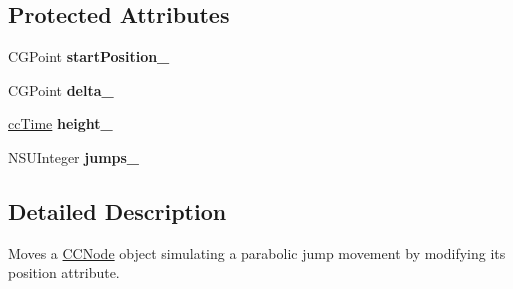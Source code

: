 \subsection*{Protected Attributes}
\begin{DoxyCompactItemize}
\item 
\hypertarget{interface_c_c_jump_by_af86c9ec10f8a7c7a73caff8ccf083383}{C\-G\-Point {\bfseries start\-Position\-\_\-}}\label{interface_c_c_jump_by_af86c9ec10f8a7c7a73caff8ccf083383}

\item 
\hypertarget{interface_c_c_jump_by_a4155293b23d8dd175de23860f7f63013}{C\-G\-Point {\bfseries delta\-\_\-}}\label{interface_c_c_jump_by_a4155293b23d8dd175de23860f7f63013}

\item 
\hypertarget{interface_c_c_jump_by_a854f06bdf7738a76cb6f2a527c0ab10f}{\hyperlink{cc_types_8h_ae6c674aac4bfb46a4e6cb1e89bb66b4f}{cc\-Time} {\bfseries height\-\_\-}}\label{interface_c_c_jump_by_a854f06bdf7738a76cb6f2a527c0ab10f}

\item 
\hypertarget{interface_c_c_jump_by_a46884c98841fca9e28e7f08626ecced5}{N\-S\-U\-Integer {\bfseries jumps\-\_\-}}\label{interface_c_c_jump_by_a46884c98841fca9e28e7f08626ecced5}

\end{DoxyCompactItemize}


\subsection{Detailed Description}
Moves a \hyperlink{class_c_c_node}{C\-C\-Node} object simulating a parabolic jump movement by modifying its position attribute. 

